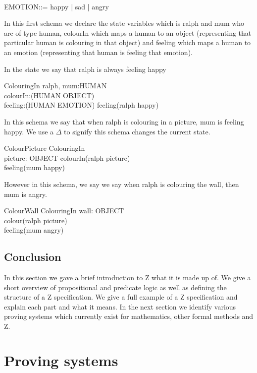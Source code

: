 \begin{zed}
[OBJECT] \\
EMOTION::= happy | sad | angry
\end{zed}

In this first schema we declare the state variables which is ralph and mum who are of type human, colourIn which maps a human to an object (representing that particular human is colouring in that object) and feeling which maps a human to an emotion (representing that human is feeling that emotion).

In the state we say that ralph is always feeling happy
\begin{schema}{ColouringIn}
ralph, mum:HUMAN \\
colourIn:(HUMAN \pfun OBJECT) \\
feeling:(HUMAN \pfun EMOTION)
\where
feeling(ralph \mapsto happy)
\end{schema}

In this schema we say that when ralph is colouring in a picture, mum is feeling happy. We use a $\Delta$ to signify this schema changes the current state.
\begin{schema}{ColourPicture}
\Delta ColouringIn \\
picture: OBJECT 
\where
colourIn(ralph \mapsto picture) \\
feeling(mum \mapsto happy)
\end{schema}

However in this schema, we say we say when ralph is colouring the wall, then mum is angry.
\begin{schema}{ColourWall}
\Delta ColouringIn
wall: OBJECT \\
\where
colour(ralph \mapsto picture) \\
feeling(mum \mapsto angry)
\end{schema}

\subsection{Conclusion}

In this section we gave a brief introduction to Z what it is made up of. We give a short overview of propositional and predicate logic as well as defining the structure of a Z specification. We give a full example of a Z specification and explain each part and what it means. In the next section we identify various proving systems which currently exist for mathematics, other formal methods and Z.

\section{Proving systems}

